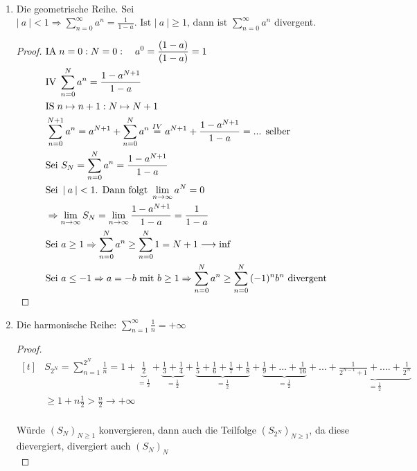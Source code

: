 \documentclass[a4paper,titlepage,oneside]{article}
\newcommand{\IA}[1][n=0]{\vspace{0.1pt}\ensuremath{\text{IA}\sp#1:}}
\newcommand{\IV}{\vspace{0.1pt}\ensuremath{\text{IV}\sp}}
\newcommand{\IS}[1][n \mapsto n+1]{\vspace{0.1pt}\ensuremath{\text{IS}\sp#1}}
\def\sp{\hspace{0,1cm}}
\newcommand{\suminf}[2][n]{\ensuremath{\sum_{#1= 0}^{\infty}{#2}}}
\renewcommand{\liminf}[2][n]{\ensuremath{\lim\limits_{#1 \rightarrow \infty}{#2}}}
\newcommand{\abs}[1]{\ensuremath{\left|\:#1\:\right|}}
\theoremstyle{thmstyle}
\begin{document}
\begin{subbsp}\
\begin{enumerate}
\item Die geometrische Reihe. Sei \(\abs{a} < 1 \Rightarrow \suminf{a^n} = \frac{1}{1-a}\text{. Ist }\abs{a} \ge 1\text{, dann ist }\suminf{a^n}\) divergent.
\begin{proof}$\begin{aligned}[t]
&\IA {N=0}: \quad a^0 = \frac{(1-a)}{(1- a)} = 1\\
&\IV \sum_{n = 0}^{N}{a^n} = \frac{1-a^{N+1}}{1-a}\\
&\IS: {N \mapsto N+1}\\
&\sum_{n = 0}^{N+1}{a^n} = a^{N+1} + \sum_{n = 0}^{N}{a^n} \overset{IV}{=} a^{N+1} + \frac{1-a^{N+1}}{1-a} = \text{... selber} \\ %
&\text{Sei }S_N = \sum_{n=0}^{N}{a^n} = \frac{1 - a^{N+1}}{1- a} \\
&\text{Sei }\abs{a} < 1\text{. Dann folgt }\liminf{a^N} = 0 \\
&\Rightarrow \liminf{S_N} = \liminf{\frac{1-a^{N+1}}{1-a}} = \frac{1}{1-a}\\
&\text{Sei }a \ge 1 \Rightarrow \sum_{n=0}^{N}{a^n} \ge \sum_{n=0}^{N}{1} = N+1 \longrightarrow \inf \\
&\text{Sei }a \le -1 \Rightarrow a = -b \text{ mit }b \ge 1 \Rightarrow \sum_{n=0}^{N}{a^n} \ge \sum_{n=0}^{N}{(-1)^nb^n} \text{ divergent}
\end{aligned}$\\
\end{proof}

\item Die harmonische Reihe: \(\sum_{n=1}^{\infty}{\frac{1}{n}} = +\infty\)
\begin{proof}
$\begin{aligned}[t]
&S_{2^N} = \sum_{n = 1}^{2^N}{\frac{1}{n}} =
1 +\underbrace{\frac{1}{2}}_{=\frac{1}{2}} + \underbrace{\frac{1}{3} + \frac{1}{4}}_{=\frac{1}{2}} + \underbrace{\frac{1}{5} + \frac{1}{6} + \frac{1}{7} + \frac{1}{8}}_{=\frac{1}{2}} + \underbrace{\frac{1}{9} + ... + \frac{1}{16}}_{=\frac{1}{2}} + ... + \underbrace{\frac{1}{2^{N-1}+1}+ .... + \frac{1}{2^N}}_{=\frac{1}{2}} \\
&\ge 1 + n \frac{1}{2} > \frac{n}{2} \longrightarrow +\infty
\end{aligned}$
\\\\
Würde \((S_N)_{N\ge1}\) konvergieren, dann auch die Teilfolge \((S_{2^N})_{N \ge 1}\), da diese dievergiert, divergiert auch \((S_N)_N\)\\
\end{proof}


\end{enumerate}
\end{subbsp}
\end{document}
